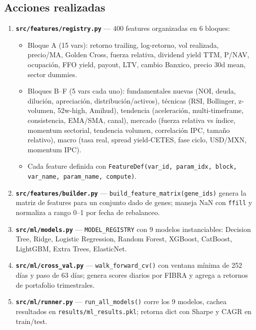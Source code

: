 \documentclass[12pt, a4paper]{article}
\begin{document}
\subsection{Acciones realizadas}

\begin{enumerate}

  \item \textbf{\texttt{src/features/registry.py}} --- 400 features organizadas en 6 bloques:
    \begin{itemize}
      \item Bloque A (15 vars): retorno trailing, log-retorno, vol realizada, precio/MA, Golden Cross, fuerza relativa, dividend yield TTM, P/NAV, ocupaci\'{o}n, FFO yield, payout, LTV, cambio Banxico, precio 30d mean, sector dummies.
      \item Bloques B--F (5 vars cada uno): fundamentales nuevas (NOI, deuda, diluci\'{o}n, apreciaci\'{o}n, distribuci\'{o}n/activos), t\'{e}cnicas (RSI, Bollinger, z-volumen, 52w-high, Amihud), tendencia (aceleraci\'{o}n, multi-timeframe, consistencia, EMA/SMA, canal), mercado (fuerza relativa vs \'{i}ndice, momentum sectorial, tendencia volumen, correlaci\'{o}n IPC, tama\~{n}o relativo), macro (tasa real, spread yield-CETES, fase ciclo, USD/MXN, momentum IPC).
      \item Cada feature definida con \texttt{FeatureDef(var\_id, param\_idx, block, var\_name, param\_name, compute)}.
    \end{itemize}

  \item \textbf{\texttt{src/features/builder.py}} --- \texttt{build\_feature\_matrix(gene\_ids)} genera la matriz de features para un conjunto dado de genes; maneja NaN con \texttt{ffill} y normaliza a rango 0--1 por fecha de rebalanceo.

  \item \textbf{\texttt{src/ml/models.py}} --- \texttt{MODEL\_REGISTRY} con 9 modelos instanciables:
    Decision Tree, Ridge, Logistic Regression, Random Forest, XGBoost, CatBoost, LightGBM, Extra Trees, ElasticNet.

  \item \textbf{\texttt{src/ml/cross\_val.py}} --- \texttt{walk\_forward\_cv()} con ventana m\'{i}nima de 252 d\'{i}as y paso de 63 d\'{i}as; genera scores diarios por FIBRA y agrega a retornos de portafolio trimestrales.

  \item \textbf{\texttt{src/ml/runner.py}} --- \texttt{run\_all\_models()} corre los 9 modelos, cachea resultados en \texttt{results/ml\_results.pkl}; retorna dict con Sharpe y CAGR en train/test.


\end{enumerate}
\end{document}
